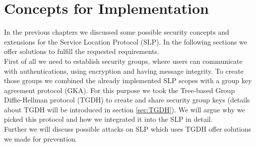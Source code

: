 \newpage
\section{Concepts for Implementation}\label{sec:concepts}
In the previous chapters we discussed some possible security concepts and extensions for the Service Location Protocol (SLP). In the following sections we offer solutions to fulfill the requested requirements.\\
First of all we need to establish security groups, where users can communicate with authentications, using encryption and having message integrity. To create those groups we combined the already implemented SLP scopes with a group key agreement protocol (GKA). For this purpose we took the Tree-based Group Diffie-Hellman protocol (TGDH) to create and share security group keys (details about TGDH will be introduced in section \ref{sec:TGDH}). We will argue why we picked this protocol and how we integrated it into the SLP in detail.\\
Further we will discuss possible attacks on SLP which uses TGDH offer solutions we made for prevention.

